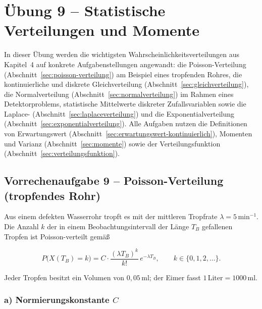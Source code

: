 \section{Übung 9 – Statistische Verteilungen und Momente}

In dieser Übung werden die wichtigsten Wahrscheinlichkeitsverteilungen aus
Kapitel~4 auf konkrete Aufgabenstellungen angewandt: die Poisson-Verteilung
(Abschnitt~\ref{sec:poisson-verteilung}) am Beispiel eines tropfenden Rohres,
die kontinuierliche und diskrete Gleichverteilung
(Abschnitt~\ref{sec:gleichverteilung}), die Normalverteilung
(Abschnitt~\ref{sec:normalverteilung}) im Rahmen eines Detektorproblems,
statistische Mittelwerte diskreter Zufallsvariablen sowie die Laplace-
(Abschnitt~\ref{sec:laplaceverteilung}) und die Exponentialverteilung
(Abschnitt~\ref{sec:exponentialverteilung}). Alle Aufgaben nutzen die
Definitionen von Erwartungswert (Abschnitt~\ref{sec:erwartungswert-kontinuierlich}),
Momenten und Varianz (Abschnitt~\ref{sec:momente}) sowie der
Verteilungsfunktion (Abschnitt~\ref{sec:verteilungsfunktion}).

\subsection*{Vorrechenaufgabe 9 – Poisson-Verteilung (tropfendes Rohr)}

Aus einem defekten Wasserrohr tropft es mit der mittleren Tropfrate
$\lambda = 5\,\mathrm{min}^{-1}$. Die Anzahl $k$ der in einem
Beobachtungsintervall der Länge $T_B$ gefallenen Tropfen ist Poisson-verteilt
gemäß

$$
P\bigl(X(T_B) = k\bigr) = C \cdot \frac{(\lambda T_B)^k}{k!}\, e^{-\lambda T_B},
\qquad k \in \{0, 1, 2, \dots\}.
$$

Jeder Tropfen besitzt ein Volumen von $0{,}05\,\mathrm{ml}$; der Eimer fasst
$1\,\mathrm{Liter} = 1000\,\mathrm{ml}$.

\subsubsection*{a) Normierungskonstante $C$}


